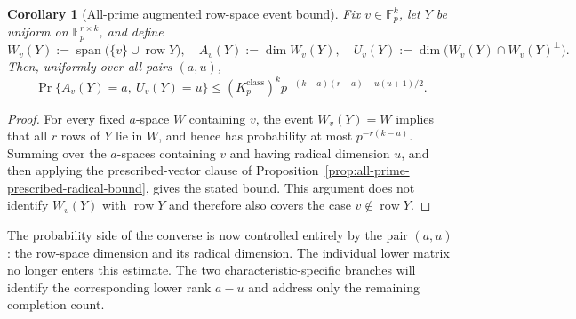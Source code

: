 \documentclass[11pt]{article}
\newcommand{\F}{\mathbb F}
\newcommand{\1}{\mathbf 1}
\theoremstyle{plain}
\newtheorem{corollary}[theorem]{Corollary}
\theoremstyle{definition}
\theoremstyle{remark}
\begin{document}
\begin{corollary}[All-prime augmented row-space event bound]
\label{cor:all-prime-augmented-row-space-event-bound}
Fix $v\in\F_p^k$, let $Y$ be uniform on $\F_p^{r\times k}$, and define
\begin{equation}
 W_v(Y):=\operatorname{span}\bigl(\{v\}\cup\operatorname{row}Y\bigr),
 \quad
 A_v(Y):=\dim W_v(Y),
 \quad
 U_v(Y):=\dim\bigl(W_v(Y)\cap W_v(Y)^\perp\bigr).
 \label{eq:all-prime-augmented-row-space-invariants}
\end{equation}
Then, uniformly over all pairs $(a,u)$,
\begin{equation}
 \Pr\{A_v(Y)=a,\ U_v(Y)=u\}
 \le (K_p^{\mathrm{class}})^k
 p^{-(k-a)(r-a)-u(u+1)/2}.
 \label{eq:all-prime-augmented-row-space-event-bound}
\end{equation}
\end{corollary}
\begin{proof}
For every fixed $a$-space $W$ containing $v$, the event $W_v(Y)=W$ implies
that all $r$ rows of $Y$ lie in $W$, and hence has probability at most
$p^{-r(k-a)}$.  Summing over the $a$-spaces containing $v$ and having radical
dimension $u$, and then applying the prescribed-vector clause of
Proposition~\ref{prop:all-prime-prescribed-radical-bound}, gives the stated
bound.  This argument does not identify $W_v(Y)$ with
$\operatorname{row}Y$ and therefore also covers the case
$v\notin\operatorname{row}Y$.
\end{proof}

The probability side of the converse is now controlled entirely by the pair
$(a,u)$: the row-space dimension and its radical dimension.  The individual
lower matrix no longer enters this estimate.  The two characteristic-specific
branches will identify the corresponding lower rank $a-u$ and address only the
remaining completion count.
\end{document}
